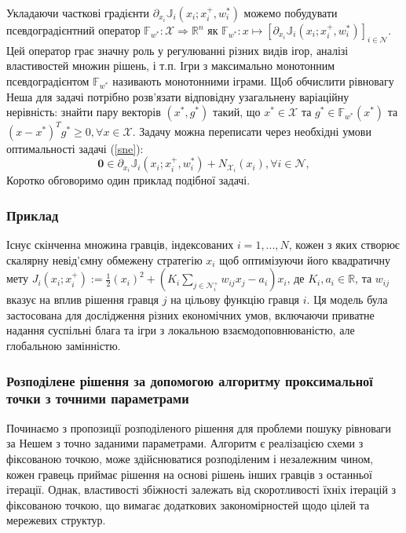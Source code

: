 \documentclass[a4paper]{article}
\begin{document}
Укладаючи часткові градієнти $\partial_{x_{i}} \mathbb{J}_{i}\left(x_{i} ; x_{i}^{+}, w_{i}^{*}\right)$ можемо побудувати псевдоградієнтний оператор $\mathbb{F}_{w^{*}}: \mathcal{X} \Rightarrow \mathbb{R}^{n}$ як $\mathbb{F}_{w^{*}}: x \mapsto\left[\partial_{x_{i}} \mathbb{J}_{i}\left(x_{i} ; x_{i}^{+}, w_{i}^{*}\right)\right]_{i \in \mathcal{N}}$. 
Цей оператор грає значну роль у регулюванні різних видів ігор, аналізі властивостей множин рішень, і т.п. Ігри з максимально монотонним псевдоградієнтом $\mathbb{F}_{w^{*}}$ називають монотонними іграми. Щоб обчислити рівновагу Неша для задачі потрібно розв'язати відповідну узагальнену варіаційну нерівність: знайти пару векторів $\left(x^{*}, g^{*}\right)$ такий, що $x^{*} \in \mathcal{X}$ та $g^{*} \in \mathbb{F}_{w^{*}}\left(x^{*}\right)$ та $\left(x-x^{*}\right)^{T} g^{*} \geq 0, \forall x \in \mathcal{X}$. Задачу можна переписати через необхідні умови оптимальності задачі (\ref{sne}):
\begin{equation}
    \mathbf{0} \in \partial_{x_{i}} \mathbb{J}_{i}\left(x_{i} ; x_{i}^{+}, w_{i}^{*}\right)+N_{\mathcal{X}_{i}}\left(x_{i}\right), \forall i \in \mathcal{N},
\end{equation}
Коротко обговоримо один приклад подібної задачі.
\subsubsection*{Приклад}
Існує скінченна множина гравців, індексованих $i = 1, . . . , N$, кожен з яких створює скалярну невід’ємну обмежену стратегію $x_i$ щоб оптимізуючи його квадратичну мету $J_{i}(x_{i} ; x_{i}^{+}):=\frac{1}{2}(x_{i})^{2}+(K_{i} \sum_{j \in \mathcal{N}_{i}^{+}} w_{i j} x_{j}-a_{i}) x_{i} \text {, де } K_{i}, a_{i} \in \mathbb{R}$, та $w_{ij}$ вказує на вплив рішення гравця $j$ на цільову функцію гравця $i$. Ця модель була застосована для дослідження різних економічних умов, включаючи приватне надання суспільні блага та ігри з локальною взаємодоповнюваністю, але глобальною замінністю.

\subsubsection{Розподілене рішення за допомогою алгоритму проксимальної точки з точними параметрами}
Починаємо з пропозиції розподіленого рішення для проблеми пошуку рівноваги за Нешем з точно заданими параметрами. Алгоритм є реалізацією схеми з фіксованою точкою, може здійснюватися розподіленим і незалежним чином, кожен гравець приймає рішення на основі рішень інших гравців з останньої ітерації. Однак, властивості збіжності залежать від скоротливості їхніх ітерацій з фіксованою точкою, що вимагає додаткових закономірностей щодо цілей та мережевих структур.
\end{document}
